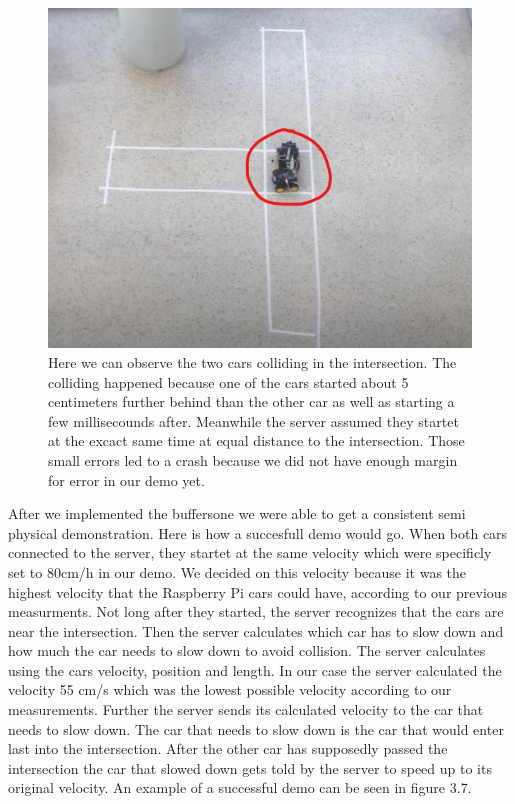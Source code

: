 \begin{figure}[h!]
	\centering
	\includegraphics[width=1\linewidth]{figures/demo_crash}
	\caption[Crash in demo]{Here we can observe the two cars colliding in the intersection. The colliding happened because one of the cars started about 5 centimeters further behind than the other car as well as starting a few millisecounds after. Meanwhile the server assumed they startet at the excact same time at equal distance to the intersection. Those small errors led to a crash because we did not have enough margin for error in our demo yet.}
	\label{fig:crashdemo}
\end{figure}

After we implemented the buffersone we were able to get a consistent semi physical demonstration. Here is how a succesfull demo would go. When both cars connected to the server, they startet at the same velocity which were specificly set to 80cm/h in our demo. We decided on this velocity because it was the highest velocity that the Raspberry Pi cars could have, according to our previous measurments. Not long after they started, the server recognizes that the cars are near the intersection. Then the server calculates which car has to slow down and how much the car needs to slow down to avoid collision. The server calculates using the cars velocity, position and length. In our case the server calculated the velocity 55 cm/s which was the lowest possible velocity according to our measurements. Further the server sends its calculated velocity to the car that needs to slow down. The car that needs to slow down is the car that would enter last into the intersection. After the other car has supposedly passed the intersection the car that slowed down gets told by the server to speed up to its original velocity. An example of a successful demo can be seen in figure 3.7.


